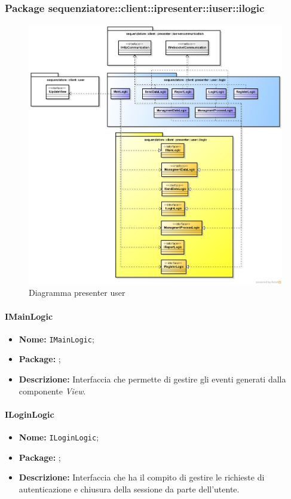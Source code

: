 \subsubsection{Package sequenziatore::client::ipresenter::iuser::ilogic}
\begin{figure}[H] \centering \includegraphics[width=%
\textwidth]
{./pack/presenter_user.png} \caption{Diagramma presenter user}
\end{figure}
\paragraph{IMainLogic}
\begin{itemize}
\item \textbf{Nome:} \texttt{IMainLogic};
\item \textbf{Package:} \texttt{\iLogicUser{}};
\item \textbf{Descrizione:} Interfaccia che permette di gestire gli eventi generati dalla componente \textit{View}.
\end{itemize}

\paragraph{ILoginLogic}
\begin{itemize}
\item \textbf{Nome:} \texttt{ILoginLogic};
\item \textbf{Package:} \texttt{\iLogicUser{}};
\item \textbf{Descrizione:} Interfaccia che ha il compito di gestire le richieste di autenticazione e chiusura della sessione da parte dell'utente.
\end{itemize}

